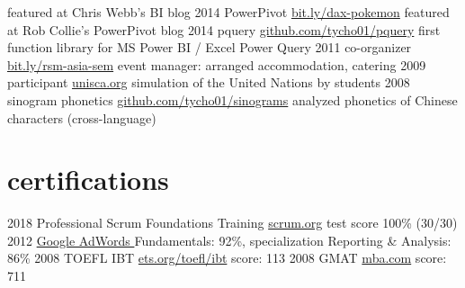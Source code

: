 \documentclass[]{friggeri-cv}
\begin{document}
\begin{entrylist}
    {
      featured at
      Chris Webb's BI blog
    }
  \entry
    {2014}
    {%
PowerPivot 
    }
    {\href{https://powerpivotpro.com/2014/02/optimal-set-selection-power-pivot-does-pokemon-and-my-brain-just-exploded/}{bit.ly/dax-pokemon}}
    {
      featured at
      Rob Collie's PowerPivot blog
    }
  \entry
    {2014}
    {pquery}
    {\href{https://github.com/KiaraGrouwstra/pquery}{github.com/tycho01/pquery}}
    {
      first function library for
      MS Power BI / Excel Power Query
    }
  \entry
    {2011}
    {%
co-organizer
    }
    {\href{https://www.facebook.com/Doing-Business-in-Asia-Seminar-310520148998549/}{bit.ly/rsm-asia-sem}}
    {
      event manager:
      arranged accommodation, catering
    }
  \entry
    {2009}
    {%
participant
    }
    {\href{http://unisca.org/}{unisca.org}}
    {
      simulation of the United Nations by students
    }
  \entry
    {2008}
    {%
sinogram phonetics
    }
    {\href{https://github.com/KiaraGrouwstra/sinograms}{github.com/tycho01/sinograms}}
    {
      analyzed phonetics of Chinese characters (cross-language)
    }
\end{entrylist}

\section{certifications}

\begin{entrylist}
  \entry
    {2018}
    {Professional Scrum Foundations Training}
    {\href{https://www.scrum.org/courses/professional-scrum-foundations-training}{scrum.org}}
    {test score 100\% (30/30)}
  \entry
    {2012}
    {\href{https://support.google.com/partners/answer/3154326}{Google AdWords }}
    {}
    {Fundamentals: 92\%,
    specialization
    Reporting \& Analysis: 86\%}
  \entry
    {2008}
    {TOEFL IBT}
    {\href{https://www.ets.org/toefl/ibt}{ets.org/toefl/ibt}}
    {score: 113}
  \entry
    {2008}
    {GMAT}
    {\href{https://www.mba.com/}{mba.com}}
    {score: 711}
\end{entrylist}
\end{document}
